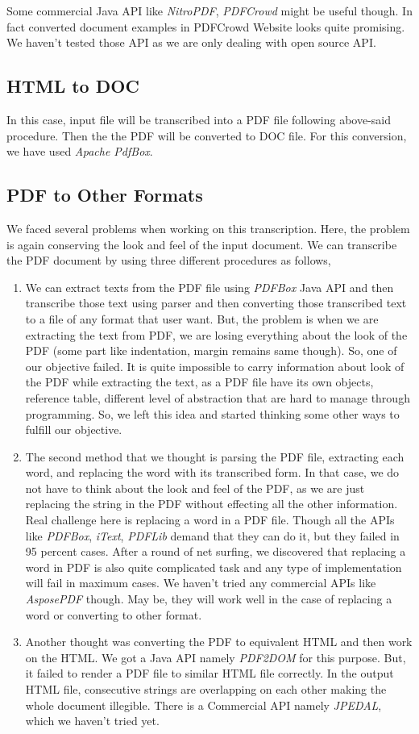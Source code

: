 \documentclass[12pt,oneside,openany,a4paper]{book}
\begin{document}
Some commercial Java API like \emph{NitroPDF}, \emph{PDFCrowd} might be useful though. In fact converted document examples in PDFCrowd Website looks quite promising. We haven't tested those API as we are only dealing with open source API.

\subsection{HTML to DOC}
In this case, input file will be transcribed into a PDF file following above-said procedure. Then the the PDF will be converted to DOC file. For this conversion, we have used \emph{Apache PdfBox}.

\subsection{PDF to Other Formats}
We faced several problems when working on this transcription. Here, the problem is again conserving the look and feel of the input document. We can transcribe the PDF document by using three different procedures as follows, 

\begin{enumerate}[label=\roman*)]
\item{We can extract texts from the PDF file using \emph{PDFBox} Java API and then transcribe those text using parser and then converting those transcribed text to a file of any format that user want. But, the problem is when we are extracting the text from PDF, we are losing everything about the look of the PDF (some part like indentation, margin remains same though). So, one of our objective failed. It is quite impossible to carry information about look of the PDF while extracting the text, as a PDF file have its own objects, reference table, different level of abstraction that are hard to manage through programming. So, we left this idea and started thinking some other ways to fulfill our objective.}
\item{The second method that we thought is parsing the PDF file, extracting each word, and replacing the word with its transcribed form. In that case, we do not have to think about the look and feel of the PDF, as we are just replacing the string in the PDF without effecting all the other information. Real challenge here is replacing a word in a PDF file. Though all the APIs like \emph{PDFBox}, \emph{iText}, \emph{PDFLib} demand that they can do it, but they failed in 95 percent cases. After a round of net surfing, we discovered that replacing a word in PDF is also quite complicated task and any type of implementation will fail in maximum cases. We haven't tried any commercial APIs like \emph{AsposePDF} though. May be, they will work well in the case of replacing a word or converting to other format.}
\item{Another thought was converting the PDF to equivalent HTML and then work on the HTML. We got a Java API namely \emph{PDF2DOM} for this purpose. But, it failed to render a PDF file to similar HTML file correctly. In the output HTML file, consecutive strings are overlapping on each other making the whole document illegible. There is a Commercial API namely \emph{JPEDAL}, which we haven't tried yet.}
\end{enumerate}
\end{document}
